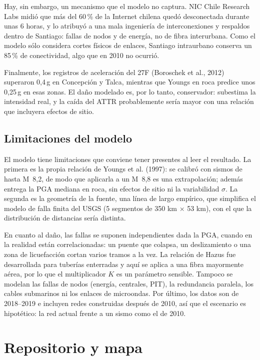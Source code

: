 \documentclass[11pt,a4paper]{article}
\begin{document}
Hay, sin embargo, un mecanismo que el modelo no captura. NIC Chile Research Labs midió que más del
60\,\% de la Internet chilena quedó desconectada durante unas 6 horas, y lo atribuyó a una mala
ingeniería de interconexiones y respaldos dentro de Santiago: fallas de nodos y de energía, no de fibra
interurbana. Como el modelo sólo considera cortes físicos de enlaces, Santiago intraurbano conserva un
85\,\% de conectividad, algo que en 2010 no ocurrió.

Finalmente, los registros de aceleración del 27F (Boroschek et al., 2012) superaron 0,4\,g en
Concepción y Talca, mientras que Youngs en roca predice unos 0,25\,g en esas zonas. El daño modelado es,
por lo tanto, conservador: subestima la intensidad real, y la caída del ATTR probablemente sería mayor
con una relación que incluyera efectos de sitio.

\subsection{Limitaciones del modelo}
El modelo tiene limitaciones que conviene tener presentes al leer el resultado. La primera es la propia
relación de Youngs et al. (1997): se calibró con sismos de hasta M~8,2, de modo que aplicarla a un
M~8,8 es una extrapolación; además entrega la PGA mediana en roca, sin efectos de sitio ni la
variabilidad $\sigma$. La segunda es la geometría de la fuente, una línea de largo empírico, que
simplifica el modelo de falla finita del USGS (5 segmentos de 350 km $\times$ 53 km), con el que la
distribución de distancias sería distinta.

En cuanto al daño, las fallas se suponen independientes dada la PGA, cuando en la realidad están
correlacionadas: un puente que colapsa, un deslizamiento o una zona de licuefacción cortan varios
tramos a la vez. La relación de Hazus fue desarrollada para tuberías enterradas y aquí se aplica a una
fibra mayormente aérea, por lo que el multiplicador $K$ es un parámetro sensible. Tampoco se modelan
las fallas de nodos (energía, centrales, PIT), la redundancia paralela, los cables submarinos ni los
enlaces de microondas. Por último, los datos son de 2018--2019 e incluyen redes construidas después de
2010, así que el escenario es hipotético: la red actual frente a un sismo como el de 2010.

\section{Repositorio y mapa}
\end{document}
